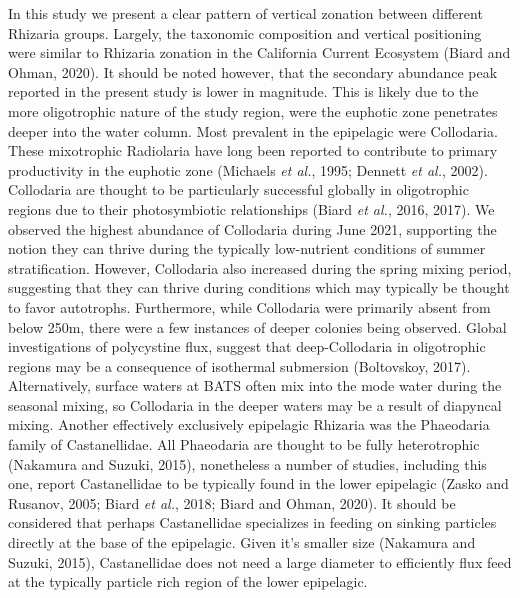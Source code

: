 \documentclass[
]{article}
\begin{document}
In this study we present a clear pattern of vertical zonation between
different Rhizaria groups. Largely, the taxonomic composition and
vertical positioning were similar to Rhizaria zonation in the California
Current Ecosystem (Biard and Ohman, 2020). It should be noted however,
that the secondary abundance peak reported in the present study is lower
in magnitude. This is likely due to the more oligotrophic nature of the
study region, were the euphotic zone penetrates deeper into the water
column. Most prevalent in the epipelagic were Collodaria. These
mixotrophic Radiolaria have long been reported to contribute to primary
productivity in the euphotic zone (Michaels \emph{et al.}, 1995; Dennett
\emph{et al.}, 2002). Collodaria are thought to be particularly
successful globally in oligotrophic regions due to their photosymbiotic
relationships (Biard \emph{et al.}, 2016, 2017). We observed the highest
abundance of Collodaria during June 2021, supporting the notion they can
thrive during the typically low-nutrient conditions of summer
stratification. However, Collodaria also increased during the spring
mixing period, suggesting that they can thrive during conditions which
may typically be thought to favor autotrophs. Furthermore, while
Collodaria were primarily absent from below 250m, there were a few
instances of deeper colonies being observed. Global investigations of
polycystine flux, suggest that deep-Collodaria in oligotrophic regions
may be a consequence of isothermal submersion (Boltovskoy, 2017).
Alternatively, surface waters at BATS often mix into the mode water
during the seasonal mixing, so Collodaria in the deeper waters may be a
result of diapyncal mixing. Another effectively exclusively epipelagic
Rhizaria was the Phaeodaria family of Castanellidae. All Phaeodaria are
thought to be fully heterotrophic (Nakamura and Suzuki, 2015),
nonetheless a number of studies, including this one, report
Castanellidae to be typically found in the lower epipelagic (Zasko and
Rusanov, 2005; Biard \emph{et al.}, 2018; Biard and Ohman, 2020). It
should be considered that perhaps Castanellidae specializes in feeding
on sinking particles directly at the base of the epipelagic. Given it's
smaller size (Nakamura and Suzuki, 2015), Castanellidae does not need a
large diameter to efficiently flux feed at the typically particle rich
region of the lower epipelagic.
\end{document}
